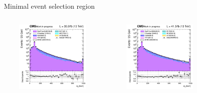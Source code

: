 \documentclass[8pt]{beamer}
\begin{document}
\begin{frame}{Minimal event selection region}
\begin{columns}
\end{columns} \vspace{-5pt}
\begin{columns}
		\begin{column}{0.33\textwidth}
			\begin{center}
			\vspace{-8pt}
			\begin{block}{}\end{block}\vspace{10pt}
     			\includegraphics[width=1.0\textwidth, height=100pt]{figs/2016/log_cratio_inclusiveCR_ll_mll.png}
    		\end{center}		
		\end{column} 
		\begin{column}{0.33\textwidth}
			\begin{center}
			\vspace{-8pt}
			\begin{block}{}\end{block}\vspace{10pt}
     			\includegraphics[width=1.0\textwidth, height=100pt]{figs/2017/log_cratio_inclusiveCR_ll_mll.png}
    		\end{center}		
		\end{column} 
		\begin{column}{0.33\textwidth}
			\begin{center}

\end{center}
\end{column}
\end{columns}
\end{frame}
\end{document}
